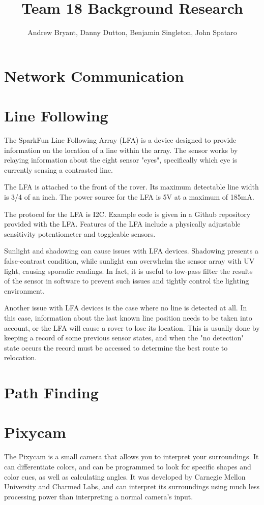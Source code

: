 \documentclass[12pt,letterpaper]{article}
\author{Andrew Bryant, Danny Dutton, Benjamin Singleton, John Spataro}
\title{Team 18 Background Research}
\begin{document}
\maketitle

\section{Network Communication}

\section{Line Following}
The SparkFun Line Following Array (LFA) is a device designed to provide information on the location of a line within the array. The sensor works by relaying information about the eight sensor "eyes", specifically which eye is currently sensing a contrasted line. 

The LFA is attached to the front of the rover. Its maximum detectable line width is 3/4 of an inch. The power source for the LFA is 5V at a maximum of 185mA. 

The protocol for the LFA is I2C. Example code is given in a Github repository provided with the LFA. Features of the LFA include a physically adjustable sensitivity potentiometer and toggleable sensors. 

Sunlight and shadowing can cause issues with LFA devices. Shadowing presents a false-contrast condition, while sunlight can overwhelm the sensor array with UV light, causing sporadic readings. In fact, it is useful to low-pass filter the results of the sensor in software to prevent such issues and tightly control the lighting environment.

Another issue with LFA devices is the case where no line is detected at all. In this case, information about the last known line position needs to be taken into account, or the LFA will cause a rover to lose its location. This is usually done by keeping a record of some previous sensor states, and when the "no detection" state occurs the record must be accessed to determine the best route to relocation.

\section{Path Finding}

\section{Pixycam}
The Pixycam is a small camera that allows you to interpret your surroundings. It can differentiate colors, and can be programmed to look for specific shapes and color cues, as well as calculating angles. It was developed by Carnegie Mellon University and Charmed Labs, and can interpret its surroundings using much less processing power than interpreting a normal camera’s input. 
\end{document}
